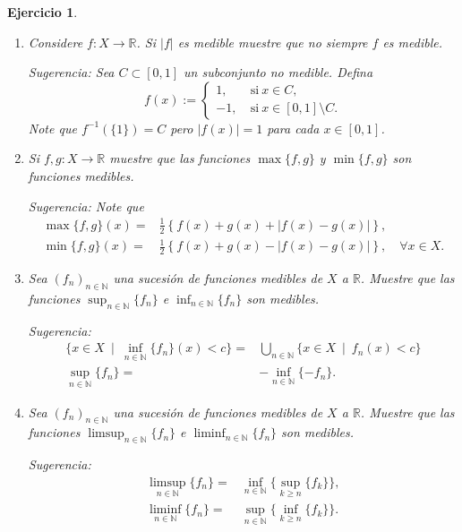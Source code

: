 \documentclass[twoside,12pt,a4 paper,openright]{book}
\newtheorem{ejer}[claim]{Ejercicio}
\begin{document}
\begin{ejer}\ {} 
\begin{enumerate}
\item  Considere $f:X \to \mathbb R$.  Si    $| f |$ es medible muestre que no siempre  $f$ es medible. 

Sugerencia: Sea $C\subset [0,1]$ un subconjunto no medible. Defina 
$$f(x):=\left\{ \begin{array}{cl} 1  , & \ \textrm{si} \  x\in C ,\\   
 -1  , & \ \textrm{si} \  x\in [0,1]\setminus C. \end{array}   \right. $$  
Note que  $f^{-1}(\{1\}) =C$ pero $|f(x)|=1$ para cada $x\in [0,1]$.

\item Si $f,g :X\to \mathbb R$ muestre que las funciones $\max\{f,g\}$ y $\min\{f,g\}$ son funciones medibles. 


Sugerencia:   
Note que  
\begin{align*}
 \max\{f,g\}(x)   = & \frac{1}{2} \left\{ f (x) + g(x)  + |  f (x) -g(x) | \right\}  ,\\
  \min\{f,g\}(x)   = & \frac{1}{2} \left\{ f (x) + g(x)  - |  f (x) -g(x) | \right\}  ,\quad \forall x\in X.
  \end{align*}
  
\item Sea $(f_n)_{n\in\mathbb N} $   una sucesi\'on de funciones medibles de $X$ a $\mathbb R$.  Muestre que 
las funciones $\sup_{n\in \mathbb N}\{f_n\}$ e $\inf_{n\in \mathbb N}\{f_n\}$ son medibles.

Sugerencia:   
 \begin{align*}
\{ x\in X \ \mid \  \inf_{n\in \mathbb N}\{f_n\} (x) <c \} = & \bigcup_{n\in \mathbb N}  \{ x\in X \ \mid \   f_n (x) <c \}\\
   \sup_{n\in \mathbb N}\{f_n\}  = & -  \inf_{n\in \mathbb N}\{-f_n\} . \end{align*}



\item Sea $(f_n)_{n\in\mathbb N} $   una sucesi\'on de funciones medibles de $X$ a $\mathbb R$.  Muestre que 
las funciones $\limsup_{n\in \mathbb N}\{f_n\}$ e $\liminf_{n\in \mathbb N}\{f_n\}$ son medibles.

Sugerencia:
 \begin{align*}
 \limsup_{n\in \mathbb N}\{f_n\} = & \inf_{n\in \mathbb N} \{ \sup_{ k\geq n}\{f_k\} \} , \\
   \liminf_{n\in \mathbb N}\{f_n\} = & \sup_{n\in \mathbb N}\{  \inf_{ k\geq n}\{f_k\} \}. 
   \end{align*}
    


\end{enumerate}
\end{ejer}
\end{document}
